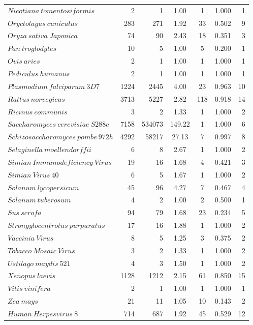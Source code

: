 \begin{table}[h]
\begin{tabular}{@{\makebox[2em][r]{\rownumber\space}} | lrrcccr}
        $ Nicotiana \ tomentosiformis $ & 2 & 1 & 1.00 & 1 & 1.000 & 1 \\ 
        $ Oryctolagus \ cuniculus $ & 283 & 271 & 1.92 & 33 & 0.502 & 9 \\ 
        $ Oryza \ sativa \ Japonica $ & 74 & 90 & 2.43 & 18 & 0.351 & 3 \\ 
        $ Pan \ troglodytes $ & 10 & 5 & 1.00 & 5 & 0.200 & 1 \\ 
        $ Ovis \ aries $ & 2 & 1 & 1.00 & 1 & 1.000 & 1 \\ 
        $ Pediculus \ humanus $ & 2 & 1 & 1.00 & 1 & 1.000 & 1 \\ 
        $ Plasmodium \ falciparum \ 3D7 $ & 1224 & 2445 & 4.00 & 23 & 0.963 & 10 \\ 
        $ Rattus \ norvegicus $ & 3713 & 5227 & 2.82 & 118 & 0.918 & 14 \\ 
        $ Ricinus \ communis $ & 3 & 2 & 1.33 & 1 & 1.000 & 2 \\ 
        $ Saccharomyces \ cerevisiae \ S288c $ & 7158 & 534073 & 149.22 & 1 & 1.000 & 6 \\ 
        $ Schizosaccharomyces \ pombe \ 972h $ & 4292 & 58217 & 27.13 & 7 & 0.997 & 8 \\ 
        $ Selaginella \ moellendorffii $ & 6 & 8 & 2.67 & 1 & 1.000 & 2 \\ 
        $ Simian \ Immunodeficiency \ Virus $ & 19 & 16 & 1.68 & 4 & 0.421 & 3 \\ 
        $ Simian \ Virus \ 40 $ & 6 & 5 & 1.67 & 1 & 1.000 & 2 \\ 
        $ Solanum \ lycopersicum $ & 45 & 96 & 4.27 & 7 & 0.467 & 4 \\ 
        $ Solanum \ tuberosum $ & 4 & 2 & 1.00 & 2 & 0.500 & 1 \\ 
        $ Sus \ scrofa $ & 94 & 79 & 1.68 & 23 & 0.234 & 5 \\ 
        $ Strongylocentrotus \ purpuratus $ & 17 & 16 & 1.88 & 1 & 1.000 & 2 \\ 
        $ Vaccinia \ Virus $ & 8 & 5 & 1.25 & 3 & 0.375 & 2 \\ 
        $ Tobacco \ Mosaic \ Virus $ & 3 & 2 & 1.33 & 1 & 1.000 & 2 \\ 
        $ Ustilago \ maydis \ 521 $ & 4 & 3 & 1.50 & 1 & 1.000 & 2 \\ 
        $ Xenopus \ laevis $ & 1128 & 1212 & 2.15 & 61 & 0.850 & 15 \\ 
        $ Vitis \ vinifera $ & 2 & 1 & 1.00 & 1 & 1.000 & 1 \\ 
        $ Zea \ mays $ & 21 & 11 & 1.05 & 10 & 0.143 & 2 \\ 
        $ Human \ Herpesvirus \ 8 $ & 714 & 687 & 1.92 & 45 & 0.529 & 12 \\ 
		\bottomrule
    \end{tabular}
\end{table}